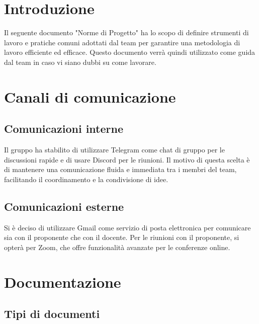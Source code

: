 \documentclass[a4paper, 12pt]{article}
\begin{document}
    \section{Introduzione}
    Il seguente documento "Norme di Progetto" ha lo scopo di definire strumenti di lavoro e pratiche comuni adottati dal team per garantire una metodologia di lavoro efficiente ed efficace.
    Questo documento verrà quindi utilizzato come guida dal team in caso vi siano dubbi su come lavorare.

    \section{Canali di comunicazione}
    
    \subsection{Comunicazioni interne}
    Il gruppo ha stabilito di utilizzare Telegram come chat di gruppo per le discussioni rapide e di usare Discord per le riunioni. 
    Il motivo di questa scelta è di mantenere una comunicazione fluida e immediata tra i membri del team, facilitando il coordinamento e la condivisione di idee.
    
    \subsection{Comunicazioni esterne}
    Si è deciso di utilizzare Gmail come servizio di posta elettronica per comunicare sia con il proponente che con il docente. 
    Per le riunioni con il proponente, si opterà per Zoom, che offre funzionalità avanzate per le conferenze online.

    \section{Documentazione}
    
    \subsection{Tipi di documenti}
\end{document}

